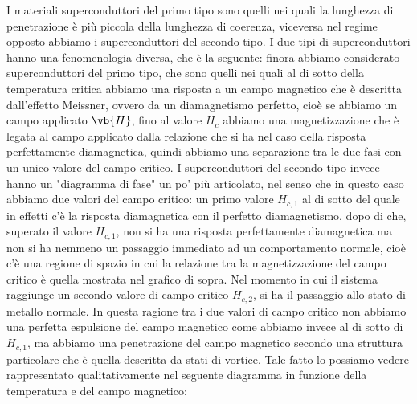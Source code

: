 \hspace{-0.6cm}I materiali superconduttori del primo tipo sono quelli nei quali la lunghezza di penetrazione è più piccola della lunghezza di coerenza, viceversa nel regime opposto abbiamo i superconduttori del secondo tipo. I due tipi di superconduttori hanno una fenomenologia diversa, che è la seguente: finora abbiamo considerato superconduttori del primo tipo, che sono quelli nei quali al di sotto della temperatura critica abbiamo una risposta a un campo magnetico che è descritta dall'effetto Meissner, ovvero da un diamagnetismo perfetto, cioè se abbiamo un campo applicato $\vb{H}$, fino al valore $H_c$ abbiamo una magnetizzazione che è legata al campo applicato dalla relazione che si ha nel caso della risposta perfettamente diamagnetica, quindi abbiamo una separazione tra le due fasi con un unico valore del campo critico. I superconduttori del secondo tipo invece hanno un "diagramma di fase" un po' più articolato, nel senso che in questo caso abbiamo due valori del campo critico: un primo valore $H_{c,1}$ al di sotto del quale in effetti c'è la risposta diamagnetica con il perfetto diamagnetismo, dopo di che, superato il valore $H_{c,1}$, non si ha una risposta perfettamente diamagnetica ma non si ha nemmeno un passaggio immediato ad un comportamento normale, cioè c'è una regione di spazio in cui la relazione tra la magnetizzazione del campo critico è quella mostrata nel grafico di sopra. Nel momento in cui il sistema raggiunge un secondo valore di campo critico $H_{c,2}$, si ha il passaggio allo stato di metallo normale. In questa ragione tra i due valori di campo critico non abbiamo una perfetta espulsione del campo magnetico come abbiamo invece al di sotto di $H_{c,1}$, ma abbiamo una penetrazione del campo magnetico secondo una struttura particolare che è quella descritta da stati di vortice. Tale fatto lo possiamo vedere rappresentato qualitativamente nel seguente diagramma in funzione della temperatura e del campo magnetico:

